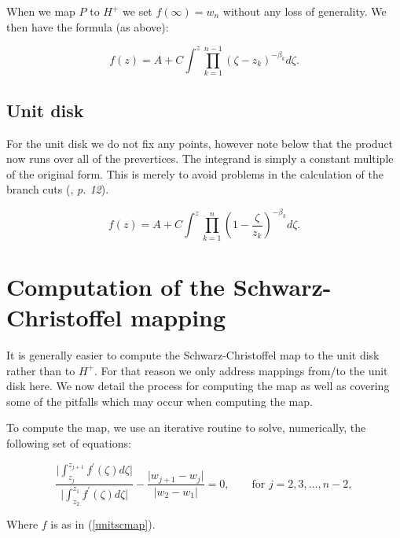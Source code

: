 \documentclass[a4paper,10pt]{amsart}
\newcommand{\sch}{Schwarz-Christoffel }
\begin{document}
When we map $P$ to $H^+$ we set $f(\infty) = w_n$ without any loss of generality. We then have the formula (as above):

\begin{equation}
f(z) = A + C \int^z \prod_{k=1}^{n-1} (\zeta-z_k)^{-\beta_k} d\zeta.
\end{equation}



\subsection{Unit disk}

For the unit disk we do not fix any points, however note below that the product now runs over all of the prevertices. The integrand is simply a constant multiple of the original form. This is merely to avoid problems in the calculation of the branch cuts (\cite{driscoll}, \emph{p. 12}).

\begin{equation}
\label{unitscmap}
f(z) = A + C \int^z \prod_{k=1}^{n} (1 - \frac{\zeta}{z_k})^{-\beta_k} d\zeta.
\end{equation}






\section{Computation of the \sch mapping}

It is generally easier to compute the \sch map to the unit disk rather than to $H^+$. For that reason we only address mappings from/to the unit disk here. We now detail the process for computing the map as well as covering some of the pitfalls which may occur when computing the map.

To compute the map, we use an iterative routine to solve, numerically, the following set of equations:

\begin{equation}
\label{optimizeme}
\frac{\vert \int_{z_j}^{z_{j+1}} f^\prime(\zeta) d\zeta \vert}{\vert \int_{z_2}^{z_{1}} f^\prime(\zeta) d\zeta\vert} - \frac{\vert w_{j+1} - w_j\vert}{\vert w_2 - w_1\vert} = 0, \qquad \text{for } j=2,3,\dots,n-2,
\end{equation}

Where $f$ is as in (\ref{unitscmap}).
\end{document}
